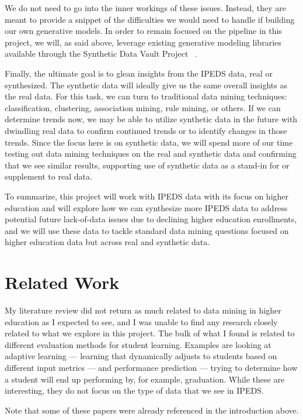 \documentclass[sigconf, authorversion, nonacm]{acmart}
\begin{document}
    We do not need to go into the inner workings of these issues. Instead, they are meant to provide a snippet of the difficulties we would need to handle if building our own generative models. In order to remain focused on the pipeline in this project, we will, as said above, leverage existing generative modeling libraries available through the Synthetic Data Vault Project ~\cite{sdv}.

    Finally, the ultimate goal is to glean insights from the IPEDS data, real or synthesized. The synthetic data will ideally give us the same overall insights as the real data. For this task, we can turn to traditional data mining techniques: classification, clustering, association mining, rule mining, or others. If we can determine trends now, we may be able to utilize synthetic data in the future with dwindling real data to confirm continued trends or to identify changes in those trends. Since the focus here is on synthetic data, we will spend more of our time testing out data mining techniques on the real and synthetic data and confirming that we see similar results, supporting use of synthetic data as a stand-in for or supplement to real data.

    To summarize, this project will work with IPEDS data with its focus on higher education and will explore how we can synthesize more IPEDS data to address potential future lack-of-data issues due to declining higher education enrollments, and we will use these data to tackle standard data mining questions focused on higher education data but across real and synthetic data.

\section{Related Work}
    My literature review did not return as much related to data mining in higher education as I expected to see, and I was unable to find any research closely related to what we explore in this project. The bulk of what I found is related to different evaluation methods for student learning. Examples are looking at adaptive learning --- learning that dynamically adjusts to students based on different input metrics --- and performance prediction --- trying to determine how a student will end up performing by, for example, graduation. While these are interesting, they do not focus on the type of data that we see in IPEDS.

    Note that some of these papers were already referenced in the introduction above.
\end{document}

